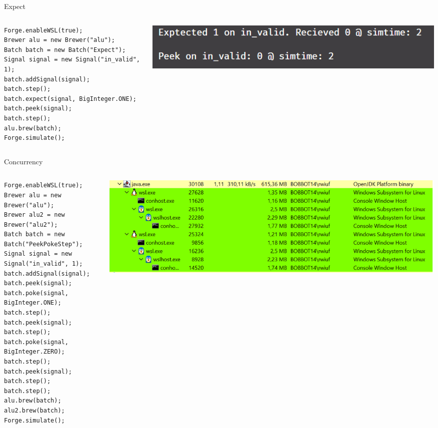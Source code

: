 \documentclass[aspectratio=169, handout]{beamer}
\begin{document}
\begin{frame}[containsverbatim]{Expect}
    \begin{columns}
        \begin{column}{.45\textwidth}
            \begin{verbatim}
Forge.enableWSL(true);
Brewer alu = new Brewer("alu");
Batch batch = new Batch("Expect");
Signal signal = new Signal("in_valid", 1);
batch.addSignal(signal);
batch.step();
batch.expect(signal, BigInteger.ONE);
batch.peek(signal);
batch.step();
alu.brew(batch);
Forge.simulate();
            \end{verbatim}
        \end{column}
        \begin{column}{.45\textwidth}
            \includegraphics[width=\columnwidth]{graphics/expectConsole.png}
        \end{column}
    \end{columns}
\end{frame}
\begin{frame}[containsverbatim]{Concurrency}
    \begin{columns}
        \begin{column}{.45\textwidth}
            \begin{verbatim}
Forge.enableWSL(true);
Brewer alu = new Brewer("alu");
Brewer alu2 = new Brewer("alu2");
Batch batch = new Batch("PeekPokeStep");
Signal signal = new Signal("in_valid", 1);
batch.addSignal(signal);
batch.peek(signal);
batch.poke(signal, BigInteger.ONE);
batch.step();
batch.peek(signal);
batch.step();
batch.poke(signal, BigInteger.ZERO);
batch.step();
batch.peek(signal);
batch.step();
batch.step();
alu.brew(batch);
alu2.brew(batch);
Forge.simulate();
            \end{verbatim}
        \end{column}
        \begin{column}{.45\textwidth}
            \includegraphics[width=\columnwidth]{graphics/concurrency.png}
        \end{column}
    \end{columns}
\end{frame}
\end{document}
